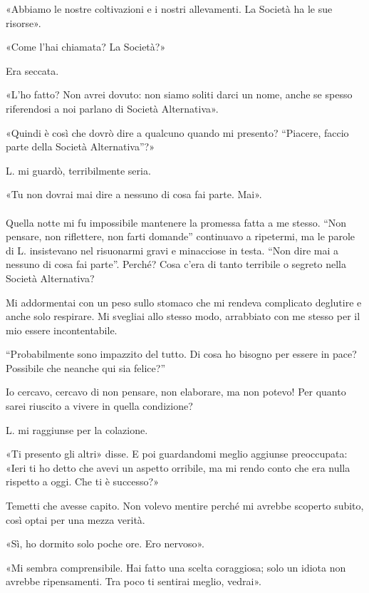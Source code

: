 \documentclass[a4paper,12pt]{book}
\begin{document}
«Abbiamo le nostre coltivazioni e i nostri allevamenti. La Società ha le sue
risorse».

«Come l'hai chiamata? La Società?»

Era seccata.

«L'ho fatto? Non avrei dovuto: non siamo soliti darci un nome, anche se spesso
riferendosi a noi parlano di Società Alternativa».

«Quindi è così che dovrò dire a qualcuno quando mi presento? ``Piacere, faccio
parte della Società Alternativa''?»

L. mi guardò, terribilmente seria.

«Tu non dovrai mai dire a nessuno di cosa fai parte. Mai».

\paragraph{}
Quella notte mi fu impossibile mantenere la promessa fatta a me stesso. ``Non
pensare, non riflettere, non farti domande'' continuavo a ripetermi, ma le
parole di L. insistevano nel risuonarmi gravi e minacciose in testa. ``Non dire
mai a nessuno di cosa fai parte''. Perché? Cosa c'era di tanto terribile o
segreto nella Società Alternativa?

Mi addormentai con un peso sullo stomaco che mi rendeva complicato deglutire e
anche solo respirare. Mi svegliai allo stesso modo, arrabbiato con me stesso
per il mio essere incontentabile.

``Probabilmente sono impazzito del tutto. Di cosa ho bisogno per essere in pace?
Possibile che neanche qui sia felice?''

Io cercavo, cercavo di non pensare, non elaborare, ma non potevo! Per quanto
sarei riuscito a vivere in quella condizione?

L. mi raggiunse per la colazione.

«Ti presento gli altri» disse. E poi guardandomi meglio aggiunse preoccupata:
«Ieri ti ho detto che avevi un aspetto orribile, ma mi rendo conto che era nulla
rispetto a oggi. Che ti è successo?»

Temetti che avesse capito. Non volevo mentire perché mi avrebbe scoperto subito,
così optai per una mezza verità.

«Sì, ho dormito solo poche ore. Ero nervoso».

«Mi sembra comprensibile. Hai fatto una scelta coraggiosa; solo un idiota non
avrebbe ripensamenti. Tra poco ti sentirai meglio, vedrai».
\end{document}
